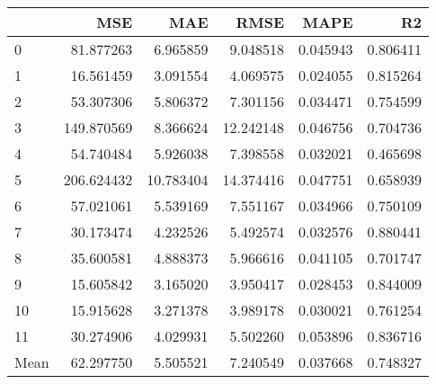 \begin{tabular}{lrrrrr}
\toprule
 & MSE & MAE & RMSE & MAPE & R2 \\
\midrule
0 & 81.877263 & 6.965859 & 9.048518 & 0.045943 & 0.806411 \\
1 & 16.561459 & 3.091554 & 4.069575 & 0.024055 & 0.815264 \\
2 & 53.307306 & 5.806372 & 7.301156 & 0.034471 & 0.754599 \\
3 & 149.870569 & 8.366624 & 12.242148 & 0.046756 & 0.704736 \\
4 & 54.740484 & 5.926038 & 7.398558 & 0.032021 & 0.465698 \\
5 & 206.624432 & 10.783404 & 14.374416 & 0.047751 & 0.658939 \\
6 & 57.021061 & 5.539169 & 7.551167 & 0.034966 & 0.750109 \\
7 & 30.173474 & 4.232526 & 5.492574 & 0.032576 & 0.880441 \\
8 & 35.600581 & 4.888373 & 5.966616 & 0.041105 & 0.701747 \\
9 & 15.605842 & 3.165020 & 3.950417 & 0.028453 & 0.844009 \\
10 & 15.915628 & 3.271378 & 3.989178 & 0.030021 & 0.761254 \\
11 & 30.274906 & 4.029931 & 5.502260 & 0.053896 & 0.836716 \\
Mean & 62.297750 & 5.505521 & 7.240549 & 0.037668 & 0.748327 \\
\bottomrule
\end{tabular}
